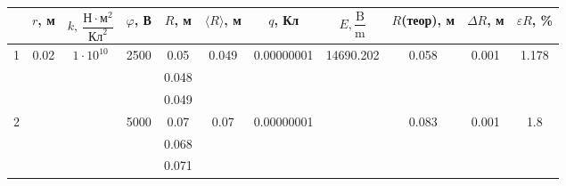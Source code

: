 \documentclass[a4paper,12pt]{article}
\begin{document}
\newpage
	\begin{table}[h!]
		\begin{tabular}{|c|c|c|c|c|c|c|c|c|c|c|}
			\hline
			& $r$, м                 & $k,\>\dfrac{\textrm{Н}\cdot\textrm{м}^2}{\textrm{Кл}^2}$ & $\varphi$,  В          & $R$, м & $\langle R\rangle$, м  & $q$, Кл                     & $E, \dfrac{\textrm{B}}{\textrm{m}}$ & $R$(теор), м          & $\Delta R$, м          & $\varepsilon R$,  \%   \\ \hline
			\multirow{3}{*}{1} & \multirow{18}{*}{0.02} & \multirow{18}{*}{$1\cdot10^{10}$}                            & \multirow{3}{*}{2500}  & 0.05   & \multirow{3}{*}{0.049} & \multirow{3}{*}{0.00000001} & \multirow{18}{*}{14690.202}     & \multirow{3}{*}{0.058} & \multirow{3}{*}{0.001} & \multirow{3}{*}{1.178} \\ \cline{5-5}
			&                        &                                                          &                        & 0.048  &                        &                             &                                 &                        &                        &                        \\ \cline{5-5}
			&                        &                                                          &                        & 0.049  &                        &                             &                                 &                        &                        &                        \\ \cline{1-1} \cline{4-7} \cline{9-11} 
			\multirow{3}{*}{2} &                        &                                                          & \multirow{3}{*}{5000}  & 0.07   & \multirow{3}{*}{0.07}  & \multirow{3}{*}{0.00000001} &                                 & \multirow{3}{*}{0.083} & \multirow{3}{*}{0.001} & \multirow{3}{*}{1.8}   \\ \cline{5-5}
			&                        &                                                          &                        & 0.068  &                        &                             &                                 &                        &                        &                        \\ \cline{5-5}
			&                        &                                                          &                        & 0.071  &                        &                             &                                 &                        &                        &                        \\ \cline{1-1} \cline{4-7} \cline{9-11} 

\end{tabular}
\end{table}
\end{document}
